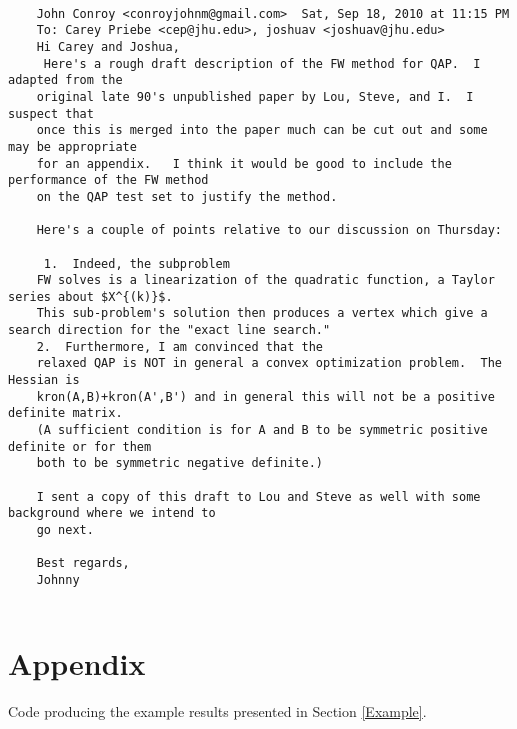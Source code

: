 \begin{verbatim}

	John Conroy <conroyjohnm@gmail.com>	 Sat, Sep 18, 2010 at 11:15 PM
	To: Carey Priebe <cep@jhu.edu>, joshuav <joshuav@jhu.edu>
	Hi Carey and Joshua,
	 Here's a rough draft description of the FW method for QAP.  I adapted from the
	original late 90's unpublished paper by Lou, Steve, and I.  I suspect that 
	once this is merged into the paper much can be cut out and some may be appropriate
	for an appendix.   I think it would be good to include the performance of the FW method
	on the QAP test set to justify the method. 

	Here's a couple of points relative to our discussion on Thursday:

	 1.  Indeed, the subproblem
	FW solves is a linearization of the quadratic function, a Taylor series about $X^{(k)}$.  
	This sub-problem's solution then produces a vertex which give a search direction for the "exact line search."   
	2.  Furthermore, I am convinced that the
	relaxed QAP is NOT in general a convex optimization problem.  The Hessian is 
	kron(A,B)+kron(A',B') and in general this will not be a positive definite matrix.
	(A sufficient condition is for A and B to be symmetric positive definite or for them
	both to be symmetric negative definite.)

	I sent a copy of this draft to Lou and Steve as well with some background where we intend to
	go next.

	Best regards,
	Johnny


\end{verbatim}


\section*{Appendix}

Code producing the example results presented in Section \ref{Example}.

